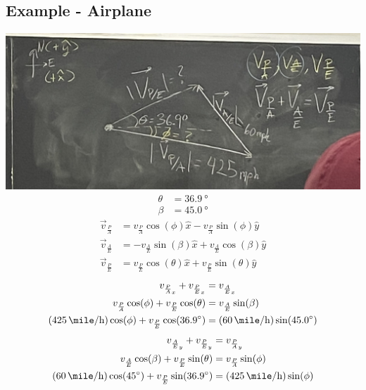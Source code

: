 \documentclass{article}
\begin{document}
\subsection{Example - Airplane}
\includegraphics[width=\linewidth]{airplane_graph.jpg}
\begin{align*}
	\theta & = \SI{36.9}{\degree} \\
	\beta & = \SI{45.0}{\degree}
\end{align*}
\begin{align*}
	\vec{v}_\frac{P}{A} & = v_\frac{P}{A}\cos(\phi)\hat{x} - v_\frac{P}{A}\sin(\phi)\hat{y} \\
	\vec{v}_\frac{A}{E} & = -v_\frac{A}{E}\sin(\beta)\hat{x} + v_\frac{A}{E}\cos(\beta)\hat{y} \\
	\vec{v}_\frac{P}{E} & = v_\frac{P}{E}\cos(\theta)\hat{x} + v_\frac{P}{E}\sin(\theta)\hat{y}
\end{align*}
\begin{align*}
	v_{\frac{P}{A}_x} + v_{\frac{P}{E}_x} & = v_{\frac{A}{E}_x} \\
	v_{\frac{P}{A}}\cos(\phi) + v_{\frac{P}{E}}\cos(\theta) & = v_{\frac{A}{E}}\sin(\beta) \\
	(\SI{425}{\mile \per \hour})\cos(\phi) + v_\frac{P}{E}\cos(\SI{36.9}{\degree}) & = (\SI{60}{\mile \per \hour})\sin(\SI{45.0}{\degree})
\end{align*}
\begin{align*}
	v_{\frac{A}{E}_y} + v_{\frac{P}{E}_y} & = v_{\frac{P}{A}_y} \\
	v_{\frac{A}{E}}\cos(\beta) + v_{\frac{P}{E}}\sin(\theta) & = v_{\frac{P}{A}}\sin(\phi) \\
	(\SI{60}{\mile \per \hour})\cos(\SI{45}{\degree}) + v_\frac{P}{E}\sin(\SI{36.9}{\degree}) & = (\SI{425}{\mile \per \hour})\sin(\phi)
\end{align*}
\end{document}
